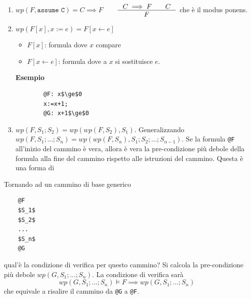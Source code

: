 \begin{enumerate}
	\item $wp(F,\texttt{assume C})=C\implies F$\ \ \ \  $\inference{C\implies F\qquad C}{F}$ che è il modus ponens.
	\item $wp(F[x], x:=e)=F[x \leftarrow e]$
	\begin{itemize}
		\item $F[x]$: formula dove $x$ compare
		\item $F[x\leftarrow e]$: formula dove a $x$ si sostituisce $e$.
	\end{itemize}
	\textbf{Esempio}
	\begin{lstlisting}
		@F: x$\ge$0
		x:=x+1;
		@G: x+1$\ge$0
	\end{lstlisting}
	\item $wp(F, S_1;S_2)=wp(wp(F,S_2),S_1)$. Generalizzando $wp(F,S_1; ... ;S_n) = wp(wp(F,S_n),S_1;S_2;...;S_{n-1})$. Se la formula \texttt{@F} all'inizio del cammino è vera, allora è vera la pre-condizione più debole della formula alla fine del cammino rispetto alle istruzioni del cammino.  Questa è una forma di 
\end{enumerate}

Tornando ad un cammino di base generico
\begin{lstlisting}
	@F
	$S_1$
	$S_2$
	...
	$S_n$
	@G
\end{lstlisting}
qual'è la condizione di verifica per questo cammino? Si calcola la pre-condizione più debole $wp(G,S_1;...;S_n)$. La condizione di verifica sarà $$wp(G,S_1;...;S_n)\models F\implies wp(G,S_1;...;S_n)$$ che equivale a risalire il cammino da \texttt{@G} a \texttt{@F}.




